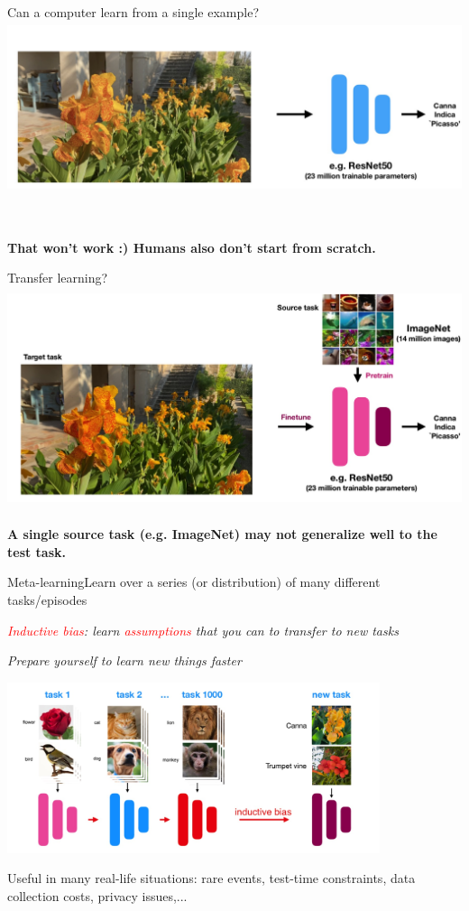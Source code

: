 \begin{frame}{Can a computer learn from a single example?}
\includegraphics[height=5cm]{image/img163023.jpg}

\hspace*{\fill} \
\hspace*{\fill} \
\pause
\centerline{\textbf{That won’t work :) Humans also don’t start from scratch.}}
\end{frame}


\begin{frame}{Transfer learning?}
\includegraphics[height=6.5cm]{image/img163705.jpg}

\pause
\small\centerline{\textbf{A single source task (e.g. ImageNet) may not generalize well to the test task.}}
\end{frame}

\begin{frame}{Meta-learning}{Learn over a series (or distribution) of many different tasks/episodes}
\centerline{\textit{\textcolor{red}{Inductive bias}: learn \textcolor{red}{assumptions} that you can to transfer to new tasks}}
\centerline{\textit{Prepare yourself to learn new things faster}}
\centering\includegraphics[height=5cm]{image/img182859.jpg}

\pause
\leavevmode\hphantom{ }

\small\centerline{Useful in many real-life situations: rare events, test-time constraints, data collection costs, privacy issues,...}
\end{frame}

